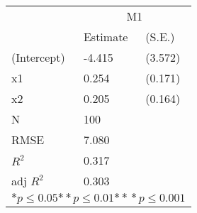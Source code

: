 \begin{tabular}{*{3}{l}}
\hline
                  & \multicolumn{2}{c}{M1}   \tabularnewline
                   &Estimate  &(S.E.)  \tabularnewline
 \hline
 \hline
   (Intercept)     &-4.415   &   (3.572) \tabularnewline
   x1              &0.254   &   (0.171) \tabularnewline
   x2              &0.205   &   (0.164) \tabularnewline
 \hline
 N                 &100       &        \tabularnewline
 RMSE             &7.080         & \tabularnewline
 $R^2$             &0.317         & \tabularnewline
 adj $R^2$         &0.303         & \tabularnewline
 \hline
\hline
 
 \multicolumn{3}{c}{${*  p}\le 0.05$${*\!\!*  p}\le 0.01$${*\!\!*\!\!*  p}\le 0.001$}\tabularnewline
 \end{tabular}